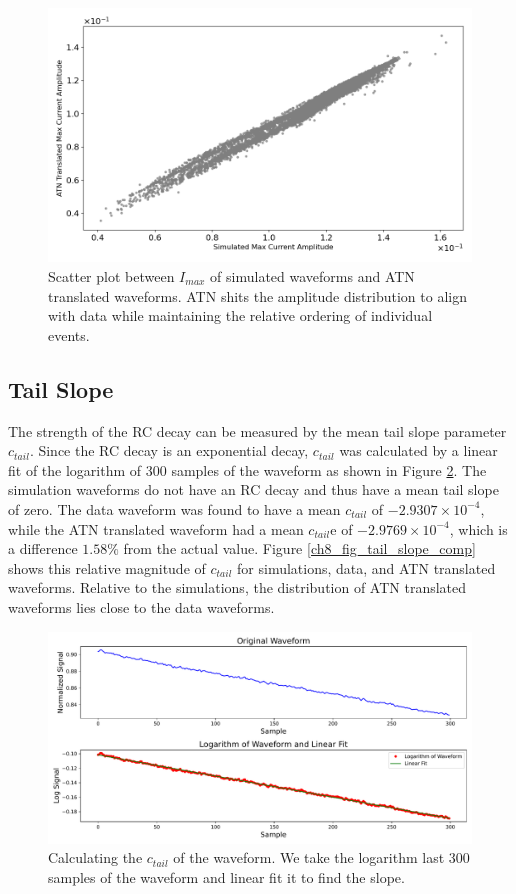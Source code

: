 \begin{figure}%
\centering
\includegraphics[width=0.9\linewidth,trim={0pc 0pc 0pc 0pc},clip]{ch8/figs/SEP_scatter_current_amplitude.png}
\caption{Scatter plot between $I_{max}$ of simulated waveforms and ATN translated waveforms. ATN shits the amplitude distribution to align with data while maintaining the relative ordering of individual events.}
\label{fig:current_amp}
\end{figure}


\subsection{Tail Slope}
The strength of the RC decay can be measured by the mean tail slope parameter $c_{tail}$. Since the RC decay is an exponential decay, $c_{tail}$ was calculated by a linear fit of the logarithm of 300 samples of the waveform as shown in Figure \ref{ch8_fig_tail_slope_calc}. The simulation waveforms do not have an RC decay and thus have a mean tail slope of zero. The data waveform was found to have a mean $c_{tail}$ of $-2.9307\times10^{-4}$, while the ATN translated waveform had a mean $c_{tail}$e of $-2.9769\times10^{-4}$, which is a difference $1.58\%$ from the actual value. Figure \ref{ch8_fig_tail_slope_comp} shows this relative magnitude of $c_{tail}$ for simulations, data, and ATN translated waveforms. Relative to the simulations, the distribution of ATN translated waveforms lies close to the data waveforms.

\begin{figure}%
    \centering
    \includegraphics[width=0.99\linewidth, trim={0.4cm 0pc 0.3cm 0cm},clip]{ch8/figs/tail_slope_calc.pdf}
    \caption{Calculating the $c_{tail}$ of the waveform. We take the logarithm last 300 samples of the waveform and linear fit it to find the slope.}
    \label{ch8_fig_tail_slope_calc}
\end{figure}


